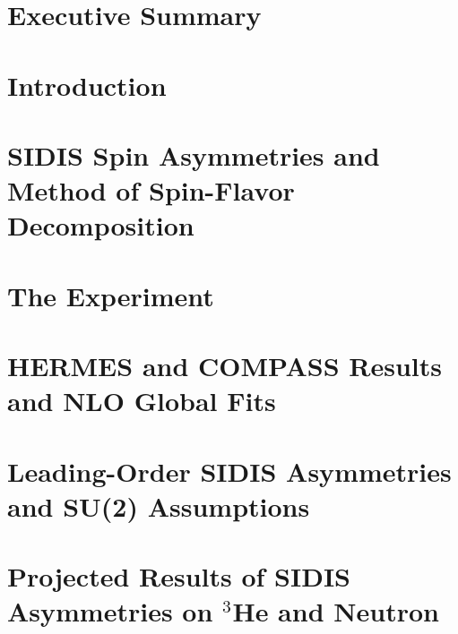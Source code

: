 \documentclass[11pt]{report}
\begin{document}
%
%

\setcounter{tocdepth}{4}
\tableofcontents

\chapter{Executive Summary}
\setcounter{page}{1}
 

%
\chapter{Introduction}


 
%
\chapter{SIDIS Spin Asymmetries and Method of Spin-Flavor Decomposition}

%
\chapter{The Experiment}
%
 
%
%
%

\appendix

\chapter{HERMES and COMPASS Results and NLO Global Fits}
\label{hermes_compass}


\chapter{Leading-Order SIDIS Asymmetries  and SU(2) Assumptions }
\label{lo_asymmetry}
 

\chapter{Projected Results of SIDIS Asymmetries on $^3$He and Neutron}
\end{document}
